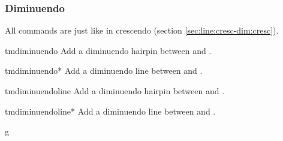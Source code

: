 \documentclass[11pt,a4paper]{ltxdoc}
\begin{document}
\subsubsection{Diminuendo}\label{sec:line:cresc-dim:dim}
All commands are just like in crescendo (section \ref{sec:line:cresc-dim:cresc}).
\begin{docCommand}{tmdiminuendo}{}
  Add a diminuendo hairpin between  and .
\end{docCommand}
\begin{docCommand}{tmdiminuendo*}{}
  Add a diminuendo line between  and .
\end{docCommand}
\begin{docCommand}{tmdiminuendoline}{}
  Add a diminuendo hairpin between  and .
\end{docCommand}
\begin{docCommand}{tmdiminuendoline*}{}
  Add a diminuendo line between  and .
\end{docCommand}
\begin{dispExample}
\begin{tmsinglestaff}
  \begin{tmstaff}{g}
  \end{tmstaff}
\end{tmsinglestaff}
\end{dispExample}
\end{document}
